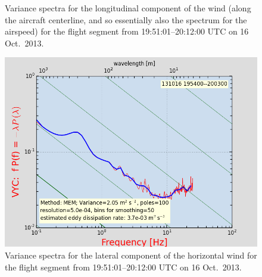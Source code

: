 \documentclass[12pt,twoside,english]{article}\usepackage[]{graphicx}\usepackage[]{color}
\let\OrgIndex\index
\renewcommand*{\index}[1]{\OrgIndex{#1}}
\begin{document}
{{\begin{appendices}
\begin{figure}
\protect\caption{\label{fig:AppxB-PSD2}Variance spectra for the longitudinal component of the wind (along the aircraft centerline, and so essentially also the spectrum for the airspeed) for the flight segment from 19:51:01--20:12:00 UTC on 16 Oct.\ 2013.} 
\end{figure}

\begin{figure}
\noindent \begin{centering}
\includegraphics[height=0.4\textheight]{SpecialGraphics/PSD3.png}  
\par\end{centering}

\protect\caption{\label{fig:AppxB-PSD3}Variance spectra for the lateral component of the horizontal wind for the flight segment from 19:51:01--20:12:00 UTC on 16 Oct.\ 2013.} 
\end{figure}


% 
% 



\end{appendices}}}
\end{document}
